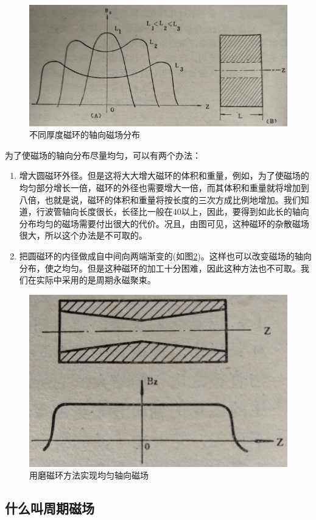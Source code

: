 \begin{figure}[phtb]
	\centering
	\includegraphics[width=0.65\linewidth]{figure/ch7-13}
	\caption{不同厚度磁环的轴向磁场分布}
	\label{ch7-13}
\end{figure}



为了使磁场的轴向分布尽量均匀，可以有两个办法：

\begin{enumerate}
	\item 增大圆磁环外径。但是这将大大增大磁环的体积和重量，例如，为了使磁场的均匀部分增长一倍，磁环的外径也需要增大一倍，而其体积和重量就将增加到八倍，也就是说，磁环的体积和重量将按长度的三次方成比例地增加。我们知道，行波管轴向长度很长，长径比一般在40以上，因此，要得到如此长的轴向分布均匀的磁场需要付出很大的代价。况且，由图可见，这种磁环的杂散磁场很大，所以这个办法是不可取的。
	\item 把圆磁环的内径做成自中间向两端渐变的(如图\ref{ch7-14})。这样也可以改变磁场的轴向分布，使之均匀。但是这种磁环的加工十分困难，因此这种方法也不可取。我们在实际中采用的是周期永磁聚束。
	\end{enumerate}
\begin{figure}[phtb]
	\centering
	\includegraphics[width=0.4\linewidth]{figure/ch7-14}
	\caption{用磨磁环方法实现均匀轴向磁场}
	\label{ch7-14}
\end{figure}
\subsection{什么叫周期磁场}

